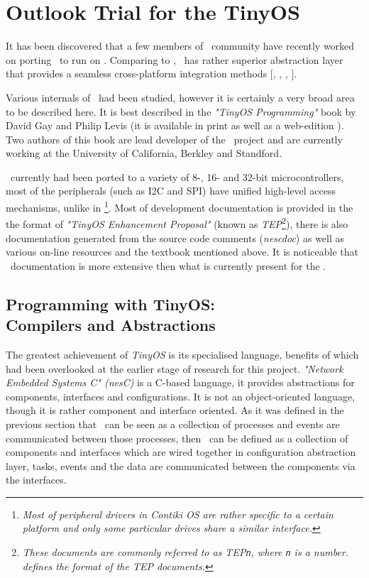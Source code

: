 \section{Outlook Trial for the TinyOS} \label{sec:TINYOS}

  It has been discovered that a few members of \TinyOS\ community
 have recently worked on porting \TinyOS\ to run on 
 \cite{links:tinyos:rfa1:p1,links:tinyos:rfa1:p2}. Comparing to \Contiki,
 \TinyOS\ has rather superior abstraction layer that provides a seamless
 cross-platform integration methods [, , , ].

 
  Various internals of \TinyOS\ had been studied, however it is 
 certainly a very broad area to be described here. It is best described
 in the \emph{"TinyOS Programming"} book by David Gay and Philip Levis
 (it is available in print as well as a web-edition \cite{levis2009tinyos}).
 Two authors of this book are lead developer of the \TinyOS\ project
 and are currently working at the University of California, Berkley
 and Standford.


  \TinyOS\ currently had been ported to a variety of 8-, 16- and
 32-bit microcontrollers, most of the peripherals (such as I2C and SPI)
 have unified high-level access mechanisms, unlike in \Contiki\footnote{
 \emph{Most of peripheral drivers in Contiki OS are rather specific to
 a certain platform and only some particular drives share a similar
 interface.}}. Most of development documentation is provided in the
 the format of \emph{"TinyOS Enhancement Proposal"} (known as
 \emph{TEP}\footnote{\emph{These documents are commonly referred to as
 TEP\texttt{n}, where \texttt{n} is a number.  defines the format
 of the TEP documents.}}), there is also documentation generated from
 the source code comments (\emph{nescdoc}) as well as various on-line
 resources \cite{tinyos:docs} and the textbook mentioned above. It is
 noticeable that \TinyOS\ documentation is more extensive then what is
 currently present for the \ContikiOS.


\subsection{Programming with TinyOS:\\Compilers and Abstractions}

  The greatest achievement of \emph{TinyOS} is its specialised language,
 benefits of which had been overlooked at the earlier stage of research
 for this project. \emph{"Network Embedded Systems C" (nesC)} is a
 C-based language, it provides abstractions for components, interfaces
 and configurations. It is not an object-oriented language, though
 it is rather component and interface oriented. As it was defined in
 the previous section that \Contiki\ can be seen as a collection of
 processes and events are communicated between those processes, then
 \TinyOS\ can be defined as a collection of components and interfaces
 which are wired together in configuration abstraction layer, tasks,
 events and the data are communicated between the components via the
 interfaces.

